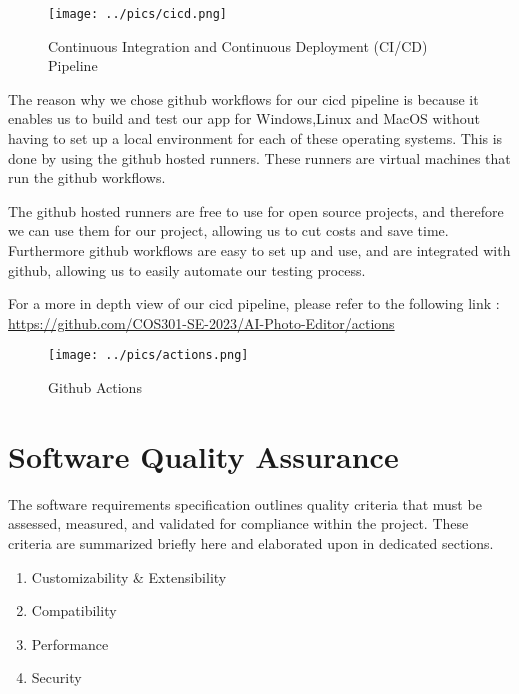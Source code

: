 \documentclass[11pt,a4paper]{article}
\begin{document}
\begin{figure}[htbp]
  \centering
  \texttt{[image: ../pics/cicd.png]}
  \caption{Continuous Integration and Continuous Deployment (CI/CD) Pipeline}
\end{figure}

The reason why we chose github workflows for our cicd pipeline is because it
enables us to build and test our app for Windows,Linux and MacOS without having
to set up a local environment for each of these operating systems. This is done
by using the github hosted runners. These runners are virtual machines that run
the github workflows. 

The github hosted runners are free to use for open source projects, and
therefore we can use them for our project, allowing us to cut costs and save
time. Furthermore github workflows are easy to set up and use, and are
integrated with github, allowing us to easily automate our testing process.

For a more in depth view of our cicd pipeline, please refer to the following
link : \url{https://github.com/COS301-SE-2023/AI-Photo-Editor/actions}

\begin{figure}[H]
  \centering
  \texttt{[image: ../pics/actions.png]}
  \caption{Github Actions}
\end{figure}

\pagebreak

\section*{Software Quality Assurance}

The software requirements specification outlines quality criteria that must be
assessed, measured, and validated for compliance within the project. These
criteria are summarized briefly here and elaborated upon in dedicated sections.


\begin{enumerate}[label*=\arabic*.]
  \item Customizability \& Extensibility
  \item Compatibility
  \item Performance
  \item Security
\end{enumerate}
\end{document}
